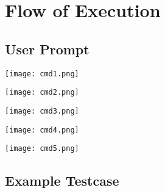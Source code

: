 \documentclass{article}
\begin{document}
\section{Flow of Execution}
\subsection{User Prompt}
\begin{center}
\texttt{[image: cmd1.png]}
\end{center}
\begin{center}
\texttt{[image: cmd2.png]}
\end{center}
\begin{center}
\texttt{[image: cmd3.png]}
\end{center}
\begin{center}
\texttt{[image: cmd4.png]}
\end{center}
\begin{center}
\texttt{[image: cmd5.png]}
\end{center}

\subsection{Example Testcase}
\end{document}
